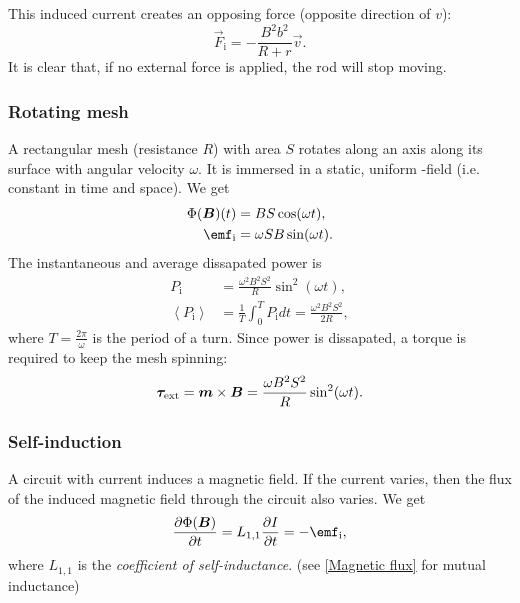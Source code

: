         This induced current creates an opposing force (opposite direction of $v$): 
        \begin{equation}
            \vec{F}_\text{i} = -\frac{B^2b^2}{R+r}\vec{v}.
        \end{equation}
        It is clear that, if no external force is applied, the rod will stop moving.

    \subsubsection{Rotating mesh}
        A rectangular mesh (resistance $R$) with area $S$ rotates along an axis along its surface with angular velocity $\omega$. 
        It is immersed in a static, uniform \B-field (i.e. constant in time and space).
        We get 
        \begin{align}
            \Phi(\B)(t) &= BS\cos (\omega t), \\
            \emf_\text{i} &= \omega S B \sin (\omega t).
        \end{align}
        The instantaneous and average dissapated power is 
        \begin{align}
            P_\text{i} &= \frac{\omega^2 B^2 S^2}{R}\sin^2(\omega t),\\
            \left<P_\text{i}\right> &= \frac{1}{T}\int_0^T P_\text{i}dt = \frac{\omega^2 B^2 S^2}{2R},
        \end{align}
        where $T = \frac{2\pi}{\omega}$ is the period of a turn.
        Since power is dissapated, a torque is required to keep the mesh spinning: 
        \begin{equation}
            \bm{\tau}_\text{ext} = \bm{m}\times\bm{B} = \frac{\omega B^2 S^2}{R}\sin^2(\omega t).
        \end{equation}
    
    \subsubsection{Self-induction}
        A circuit with current induces a magnetic field. 
        If the current varies, then the flux of the induced magnetic field through the circuit also varies. 
        We get
        \begin{equation}
            \frac{\partial \Phi(\B)}{\partial t} = L_{1,1}\frac{\partial I}{\partial t} = -\emf_{\text{i}},
        \end{equation}
        where $L_{1,1}$ is the \textit{coefficient of self-inductance}. (see \ref{Magnetic flux} for mutual inductance)

